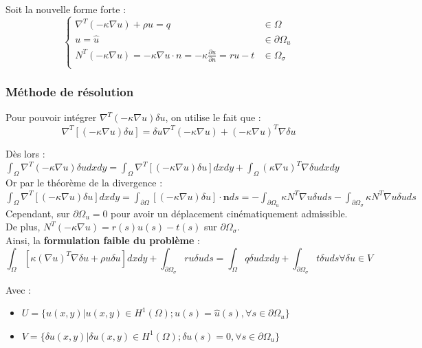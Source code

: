 \documentclass[../main.tex]{subfiles}
\begin{document}
Soit la nouvelle forme forte : \begin{equation}
    \begin{cases}
        \nabla^T(-\kappa \nabla u)+\rho u = q & \in \Omega\\
        u = \hat{u} & \in \partial \Omega_u\\
        N^T(-\kappa \nabla u) = -\kappa \nabla u \cdot n = - \kappa \frac{\partial u}{\partial n} = ru-t & \in \Omega_\sigma\\
    \end{cases}
\end{equation}

\subsubsection{Méthode de résolution}
Pour pouvoir intégrer $\nabla^T(-\kappa \nabla u) \delta u$, on utilise le fait que : \\
\begin{equation}
        \nabla^T[(-\kappa \nabla u) \delta u] = \delta u \nabla^T(-\kappa \nabla u) + (-\kappa \nabla u)^T \nabla \delta u
\end{equation}

Dès lors : $\int_\Omega \nabla^T(-\kappa \nabla u) \delta u dxdy = \int_\Omega \nabla^T[(-\kappa \nabla u) \delta u] dxdy + \int_\Omega (\kappa \nabla u)^T \nabla \delta u dxdy$\\

Or par le théorème de la divergence : $\int_\Omega \nabla^T[(-\kappa \nabla u) \delta u] dxdy = \int_{\partial \Omega} [(-\kappa \nabla u)\delta u]\cdot \mathbf{n} ds = -\int_{\partial \Omega_u} \kappa N^T \nabla u \delta u ds - \int_{\partial \Omega_\sigma} \kappa N^T \nabla u \delta u ds $\\

Cependant, sur $\partial \Omega_u = 0$ pour avoir un déplacement cinématiquement admissible. De plus, $N^T(-\kappa \nabla u) = r(s)u(s)-t(s)$ sur $\partial \Omega_\sigma$.\\

Ainsi, la \textbf{formulation faible du problème} : \begin{equation}
    \int_\Omega [\kappa(\nabla u)^T \nabla \delta u + \rho u \delta u]dxdy + \int_{\partial \Omega_\sigma} ru \delta u ds = \int_\Omega q \delta u dxdy + \int_{\partial \Omega_\sigma} t \delta uds \forall \delta u \in V
\end{equation}

Avec : \begin{itemize}
    \item $U = \{u(x,y) \lvert u(x,y) \in H^1(\Omega); u(s) = \hat{u}(s), \forall s \in \partial \Omega_u\}$\\
    \item $V = \{\delta u(x,y) \lvert \delta u(x,y) \in H^1(\Omega); \delta u(s) = 0, \forall s \in \partial \Omega_u\}$\\
\end{itemize}
\end{document}
